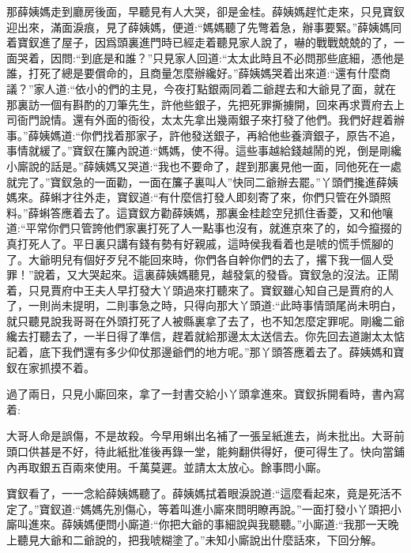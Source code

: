 \begin{parag}
    那薛姨媽走到廳房後面，早聽見有人大哭，卻是金桂。薛姨媽趕忙走來，只見寶釵迎出來，滿面淚痕，見了薛姨媽，便道:“媽媽聽了先彆着急，辦事要緊。”薛姨媽同着寶釵進了屋子，因爲頭裏進門時已經走着聽見家人說了，嚇的戰戰兢兢的了，一面哭着，因問:“到底是和誰？”只見家人回道:“太太此時且不必問那些底細，憑他是誰，打死了總是要償命的，且商量怎麼辦纔好。”薛姨媽哭着出來道:“還有什麼商議？”家人道:“依小的們的主見，今夜打點銀兩同着二爺趕去和大爺見了面，就在那裏訪一個有斟酌的刀筆先生，許他些銀子，先把死罪撕擄開，回來再求賈府去上司衙門說情。還有外面的衙役，太太先拿出幾兩銀子來打發了他們。我們好趕着辦事。”薛姨媽道:“你們找着那家子，許他發送銀子，再給他些養濟銀子，原告不追，事情就緩了。”寶釵在簾內說道:“媽媽，使不得。這些事越給錢越鬧的兇，倒是剛纔小廝說的話是。”薛姨媽又哭道:“我也不要命了，趕到那裏見他一面，同他死在一處就完了。”寶釵急的一面勸，一面在簾子裏叫人”快同二爺辦去罷。”丫頭們攙進薛姨媽來。薛蝌才往外走，寶釵道:“有什麼信打發人即刻寄了來，你們只管在外頭照料。”薛蝌答應着去了。這寶釵方勸薛姨媽，那裏金桂趁空兒抓住香菱，又和他嚷道:“平常你們只管誇他們家裏打死了人一點事也沒有，就進京來了的，如今攛掇的真打死人了。平日裏只講有錢有勢有好親戚，這時侯我看着也是唬的慌手慌腳的了。大爺明兒有個好歹兒不能回來時，你們各自幹你們的去了，撂下我一個人受罪！”說着，又大哭起來。這裏薛姨媽聽見，越發氣的發昏。寶釵急的沒法。正鬧着，只見賈府中王夫人早打發大丫頭過來打聽來了。寶釵雖心知自己是賈府的人了，一則尚未提明，二則事急之時，只得向那大丫頭道:“此時事情頭尾尚未明白，就只聽見說我哥哥在外頭打死了人被縣裏拿了去了，也不知怎麼定罪呢。剛纔二爺纔去打聽去了，一半日得了準信，趕着就給那邊太太送信去。你先回去道謝太太惦記着，底下我們還有多少仰仗那邊爺們的地方呢。”那丫頭答應着去了。薛姨媽和寶釵在家抓摸不着。
\end{parag}


\begin{parag}
    過了兩日，只見小廝回來，拿了一封書交給小丫頭拿進來。寶釵拆開看時，書內寫着:
\end{parag}


\begin{qute2sp}
    大哥人命是誤傷，不是故殺。今早用蝌出名補了一張呈紙進去，尚未批出。大哥前頭口供甚是不好，待此紙批准後再錄一堂，能夠翻供得好，便可得生了。快向當鋪內再取銀五百兩來使用。千萬莫遲。並請太太放心。餘事問小廝。
\end{qute2sp}


\begin{parag}
    寶釵看了，一一念給薛姨媽聽了。薛姨媽拭着眼淚說道:“這麼看起來，竟是死活不定了。”寶釵道:“媽媽先別傷心，等着叫進小廝來問明瞭再說。”一面打發小丫頭把小廝叫進來。薛姨媽便問小廝道:“你把大爺的事細說與我聽聽。”小廝道:“我那一天晚上聽見大爺和二爺說的，把我唬糊塗了。”未知小廝說出什麼話來，下回分解。
\end{parag}